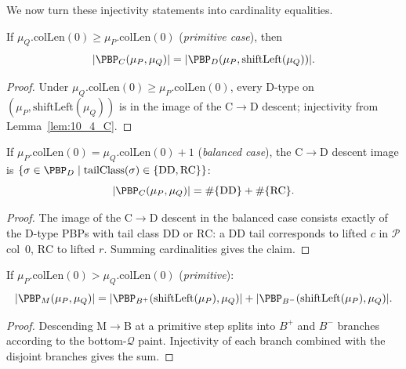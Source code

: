 We now turn these injectivity statements into cardinality equalities.

\begin{proposition}
  \label{prop:10_8_C_prim}
  \leanok
  If $\mu_Q.\mathrm{colLen}(0) \geq \mu_P.\mathrm{colLen}(0)$ (\emph{primitive case}), then
  \[ |\PBP_C(\mu_P, \mu_Q)| = |\PBP_D(\mu_P, \mathrm{shiftLeft}(\mu_Q))|. \]
\end{proposition}
\begin{proof}
  \leanok
  Under $\mu_Q.\mathrm{colLen}(0) \geq \mu_P.\mathrm{colLen}(0)$, every D-type on $(\mu_P, \mathrm{shiftLeft}(\mu_Q))$ is in the image of the C$\to$D descent; injectivity from Lemma~\ref{lem:10_4_C}.
\end{proof}


\begin{proposition}
  \label{prop:10_8_C_bal}
  \leanok
  If $\mu_P.\mathrm{colLen}(0) = \mu_Q.\mathrm{colLen}(0) + 1$ (\emph{balanced case}), the C$\to$D descent image is $\{\sigma \in \PBP_D \mid \mathrm{tailClass}(\sigma) \in \{\mathrm{DD}, \mathrm{RC}\}\}$:
  \[ |\PBP_C(\mu_P, \mu_Q)| = \#\{\mathrm{DD}\} + \#\{\mathrm{RC}\}. \]
\end{proposition}
\begin{proof}
  \leanok
  The image of the C$\to$D descent in the balanced case consists exactly of the D-type PBPs with tail class $\mathrm{DD}$ or $\mathrm{RC}$: a $\mathrm{DD}$ tail corresponds to lifted $c$ in $\mathcal{P}$ col~0, $\mathrm{RC}$ to lifted $r$. Summing cardinalities gives the claim.
\end{proof}


\begin{proposition}
  \label{prop:10_8_M_prim}
  \leanok
  If $\mu_P.\mathrm{colLen}(0) > \mu_Q.\mathrm{colLen}(0)$ (\emph{primitive}):
  \[ |\PBP_M(\mu_P, \mu_Q)| = |\PBP_{B^+}(\mathrm{shiftLeft}(\mu_P), \mu_Q)| + |\PBP_{B^-}(\mathrm{shiftLeft}(\mu_P), \mu_Q)|. \]
\end{proposition}
\begin{proof}
  \leanok
  Descending M$\to$B at a primitive step splits into $B^+$ and $B^-$ branches according to the bottom-$\mathcal{Q}$ paint. Injectivity of each branch combined with the disjoint branches gives the sum.
\end{proof}


